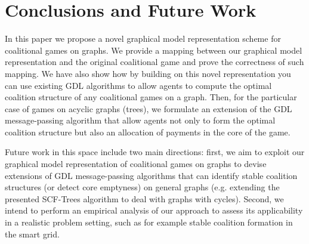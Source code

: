 \documentclass{aamas2012}
\begin{document}
          


\section{Conclusions and Future Work}
\label{sec:conclusions}
In this paper we propose a novel graphical model representation scheme for
coalitional games on graphs. We provide a mapping between
our graphical model representation and the original coalitional game and prove the
correctness of such mapping. 
We have also show how by building on this novel representation you can use
existing GDL algorithms to allow agents to compute the optimal
coalition structure of any coalitional games on a graph. Then, for the
particular case of games on acyclic graphs (trees), we formulate an extension of
the GDL message-passing algorithm that allow agents not only to form the
optimal coalition structure but also an allocation of payments in the core of
the game.

Future work in this
space include two main directions: 
first, we aim to exploit our graphical model representation of coalitional games
on graphs to devise extensions of GDL message-passing algorithms that can
identify stable coalition structures (or detect core emptyness) on general
graphs (e.g. extending the presented SCF-Trees algorithm to deal with graphs
with cycles). Second, we intend to perform an empirical analysis of our approach to assess its applicability in a realistic problem setting, such as for example stable coalition formation in the smart grid.



%
%
\small


\end{document}
